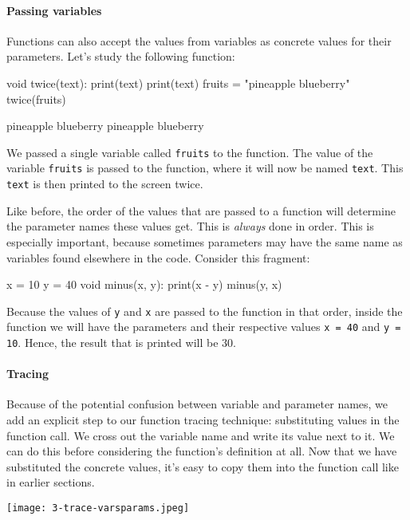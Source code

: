 \paragraph{Passing variables}

Functions can also accept the values from variables as concrete values for their parameters. Let's study the following function:

\begin{minipage}[t]{0.45\textwidth}
\vspace{-3pt}
\begin{nllisting}
void twice(text):
    print(text)
    print(text)
fruits = "pineapple blueberry"
twice(fruits)
\end{nllisting}
\end{minipage}
\begin{minipage}[t]{0.45\textwidth}
\vspace{0pt}
\begin{listing}
pineapple blueberry
pineapple blueberry
\end{listing}
\end{minipage}

We passed a single variable called \texttt{fruits} to the function. The value of the variable \texttt{fruits} is passed to the function, where it will now be named \texttt{text}. This \texttt{text} is then printed to the screen twice.

Like before, the order of the values that are passed to a function will determine the parameter names these values get. This is \emph{always} done in order. This is especially important, because sometimes parameters may have the same name as variables found elsewhere in the code. Consider this fragment:

\begin{nnflisting}
x = 10
y = 40
void minus(x, y):
    print(x - y)
minus(y, x)
\end{nnflisting}

Because the values of \texttt{y} and \texttt{x} are passed to the function in that order, inside the function we will have the parameters and their respective values \texttt{x = 40} and \texttt{y = 10}. Hence, the result that is printed will be 30.

\paragraph{Tracing}

Because of the potential confusion between variable and parameter names, we add an explicit step to our function tracing technique: substituting values in the function call. We cross out the variable name and write its value next to it. We can do this before considering the function's definition at all. Now that we have substituted the concrete values, it's easy to copy them into the function call like in earlier sections.

\texttt{[image: 3-trace-varsparams.jpeg]}
